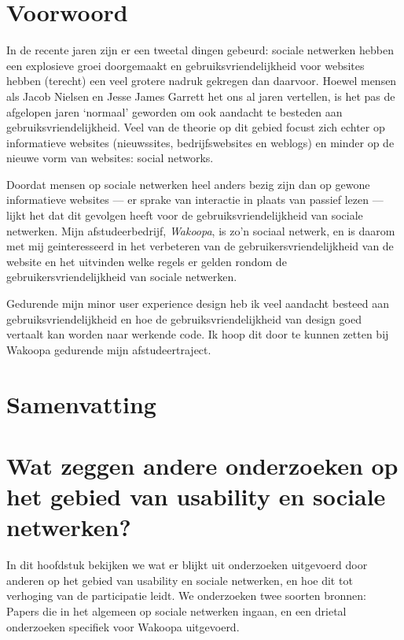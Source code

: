 \documentclass[a4paper, 10pt, pdftex]{article}
\begin{document}
  \newpage
  \section{Voorwoord}

    In de recente jaren zijn er een tweetal dingen gebeurd: sociale netwerken hebben een explosieve groei doorgemaakt
    en gebruiksvriendelijkheid voor websites hebben (terecht) een veel grotere nadruk gekregen dan daarvoor. Hoewel mensen
    als Jacob Nielsen en Jesse James Garrett het ons al jaren vertellen, is het pas de afgelopen jaren `normaal' geworden
    om ook aandacht te besteden aan gebruiksvriendelijkheid. Veel van de theorie op dit gebied focust zich echter op
    informatieve websites (nieuwssites, bedrijfswebsites en weblogs) en minder op de nieuwe vorm van websites: social networks.

    Doordat mensen op sociale netwerken heel anders bezig zijn dan op gewone informatieve websites --- er sprake van interactie in plaats van passief lezen ---
    lijkt het dat dit gevolgen heeft voor de gebruiksvriendelijkheid
    van sociale netwerken. Mijn afstudeerbedrijf, \emph{Wakoopa}, is zo'n sociaal netwerk, en is daarom met mij geinteresseerd in het verbeteren
    van de gebruikersvriendelijkheid van de website en het uitvinden welke regels er gelden rondom de gebruikersvriendelijkheid van sociale netwerken.

    Gedurende mijn minor user experience design heb ik veel aandacht besteed aan gebruiksvriendelijkheid en hoe de gebruiksvriendelijkheid van design goed vertaalt kan worden naar werkende code. Ik hoop dit door te kunnen zetten bij Wakoopa gedurende mijn afstudeertraject.



  \newpage
  \section{Samenvatting}

  \newpage
  \section{Wat zeggen andere onderzoeken op het gebied van usability en sociale netwerken?}
      In dit hoofdstuk bekijken we wat er blijkt uit onderzoeken uitgevoerd door anderen op het gebied van usability en sociale netwerken, en hoe dit tot verhoging van de participatie leidt. We onderzoeken twee soorten bronnen: Papers die in het algemeen op sociale netwerken ingaan, en een drietal onderzoeken specifiek voor Wakoopa uitgevoerd.
\end{document}
